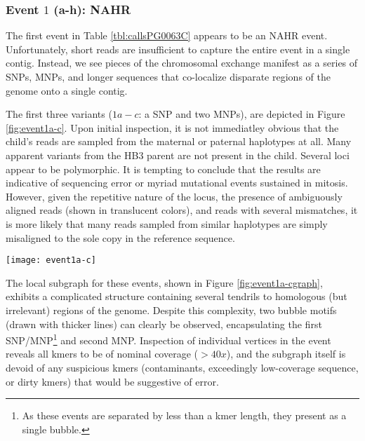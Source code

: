 \subsubsection{Event $1$ (a-h): NAHR}

The first event in Table \ref{tbl:callsPG0063C} appears to be an NAHR event.  Unfortunately, short reads are insufficient to capture the entire event in a single contig.  Instead, we see pieces of the chromosomal exchange manifest as a series of SNPs, MNPs, and longer sequences that co-localize disparate regions of the genome onto a single contig.

The first three variants ($1a-c$: a SNP and two MNPs), are depicted in Figure \ref{fig:event1a-c}.  Upon initial inspection, it is not immediatley obvious that the child's reads are sampled from the maternal or paternal haplotypes at all.  Many apparent variants from the HB3 parent are not present in the child.  Several loci appear to be polymorphic.  It is tempting to conclude that the results are indicative of sequencing error or myriad mutational events sustained in mitosis.  However, given the repetitive nature of the locus, the presence of ambiguously aligned reads (shown in translucent colors), and reads with several mismatches, it is more likely that many reads sampled from similar haplotypes are simply misaligned to the sole copy in the reference sequence.

\begin{sidewaysfigure}[h!]
  \centering
    \texttt{[image: event1a-c]}
  \caption{IGV screenshot of SNP and two MNPs: three apparent \textit{de novo} mutations within a much larger NAHR event.  Top panel: 3D7 parent.  Middle panel: HB3 parent.  Lower panel: PG0063-C child.  Variant positions are shown as red blocks at the top of the three panels below the genome position track.  Stacked barplots above variant positions indicate the proportion of bases supporting an alternate allele to the reference.}
  \label{fig:event1a-c}
\end{sidewaysfigure}

The local subgraph for these events, shown in Figure \ref{fig:event1a-cgraph}, exhibits a complicated structure containing several tendrils to homologous (but irrelevant) regions of the genome.  Despite this complexity, two bubble motifs (drawn with thicker lines) can clearly be observed, encapsulating the first SNP/MNP\footnote{As these events are separated by less than a kmer length, they present as a single bubble.} and second MNP.  Inspection of individual vertices in the event reveals all kmers to be of nominal coverage ($> 40x$), and the subgraph itself is devoid of any suspicious kmers (contaminants, exceedingly low-coverage sequence, or dirty kmers) that would be suggestive of error.

